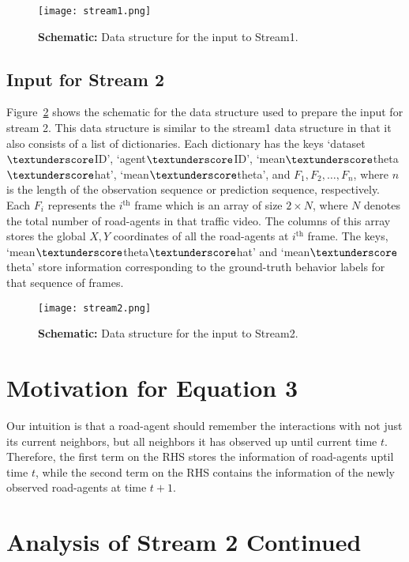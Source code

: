\documentclass[10pt,twocolumn,letterpaper]{article}
\theoremstyle{plain}
\begin{document}
\begin{figure}[h]
    \texttt{[image: stream1.png]}
    \caption{\textbf{Schematic:} Data structure for the input to Stream1.}
\label{fig:stream1}
\end{figure}

\subsection{Input for Stream 2}
Figure~\ref{fig:stream2} shows the schematic for the data structure used to prepare the input for stream 2. This data structure is similar to the stream1 data structure in that it also consists of  a list of dictionaries. Each dictionary has the keys `dataset$\textunderscore$ID', `agent$\textunderscore$ID', `mean$\textunderscore$theta$\textunderscore$hat', `mean$\textunderscore$theta', and $F_1,F_{2}, \ldots, F_{n}$, where $n$ is the length of the observation sequence or prediction sequence, respectively. Each $F_i$ represents the $i^{\textrm{th}}$ frame which is an array of size $2 \times N$, where $N$ denotes the total number of road-agents in that traffic video. The columns of this array stores the global $X,Y$ coordinates of all the road-agents at $i^{\textrm{th}}$ frame. The keys, `mean$\textunderscore$theta$\textunderscore$hat' and `mean$\textunderscore$theta' store information corresponding to the ground-truth behavior labels for that sequence of frames.

\begin{figure}[h]
\texttt{[image: stream2.png]}
    \caption{\textbf{Schematic:} Data structure for the input to Stream2.}
\label{fig:stream2}
\end{figure}



 \section{Motivation for Equation 3}

Our intuition is that a road-agent should remember the interactions with not just its current neighbors, but all neighbors it has observed up until current time $t$. Therefore, the first term on the RHS stores the information of road-agents uptil time $t$, while the second term on the RHS contains the information of the newly observed road-agents at time $t+1$.






\section{Analysis of Stream 2 Continued}
\end{document}
